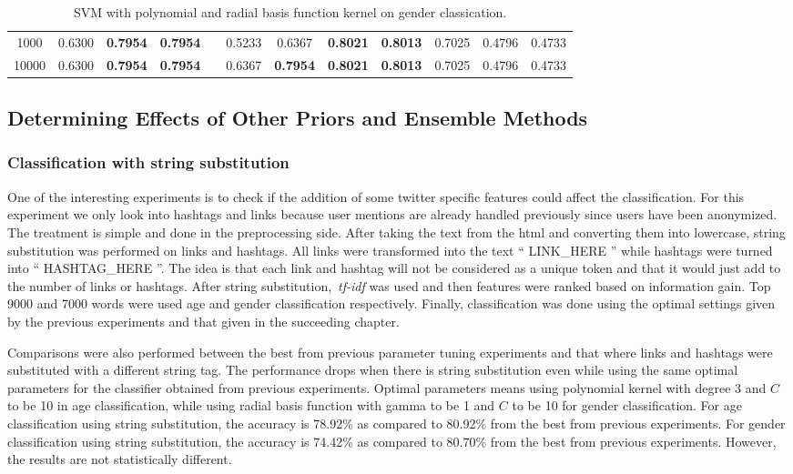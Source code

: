 \documentclass[a4paper]{llncs}
\begin{document}
\begin{table}[!htbp]
\begin{tabular}{|c|ccc|c|ccccccc|}
1000               & 0.6300 & \textbf{0.7954} & \textbf{0.7954} &  & 0.5233 & 0.6367          & \textbf{0.8021} & \textbf{0.8013} & 0.7025 & 0.4796 & 0.4733 \\ %
10000              & 0.6300 & \textbf{0.7954} & \textbf{0.7954} &  & 0.6367 & \textbf{0.7954} & \textbf{0.8021} & \textbf{0.8013} & 0.7025 & 0.4796 & 0.4733 \\ \cline{1-4} \cline{6-12} 
\end{tabular}
\caption{SVM with polynomial and radial basis function kernel on gender classication.}
\label{table:SVMPolyAndRBFGender}
\end{table}




\subsection{Determining Effects of Other Priors and Ensemble Methods}

\subsubsection{Classification with string substitution}
One of the interesting experiments is to check if the addition of some twitter specific features could affect the classification. For this experiment we only look into hashtags and links because user mentions are already handled previously since users have been anonymized. The treatment is simple and done in the preprocessing side. After taking the text from the html and converting them into lowercase, string substitution was performed on links and hashtags. All links were transformed into the text `` LINK\_HERE '' while hashtags were turned into `` HASHTAG\_HERE ''. The idea is that each link and hashtag will not be considered as a unique token and that it would just add to the number of links or hashtags. After string substitution,~\textit{tf-idf} was used and then features were ranked based on information gain. Top 9000 and 7000 words were used age and gender classification respectively. Finally, classification was done using the optimal settings given by the previous experiments and that given in the succeeding chapter. 

Comparisons were also performed between the best from previous parameter tuning experiments and that where links and hashtags were substituted with a different string tag. The performance drops when there is string substitution even while using the same optimal parameters for the classifier obtained from previous experiments. Optimal parameters means using polynomial kernel with degree 3 and $C$ to be 10 in age classification, while using radial basis function with gamma to be 1 and $C$ to be 10 for gender classification. For age classification using string substitution, the accuracy is 78.92\% as compared to 80.92\% from the best from previous experiments. For gender classification using string substitution, the accuracy is 74.42\% as compared to 80.70\% from the best from previous experiments. However, the results are not statistically different.
\end{document}
